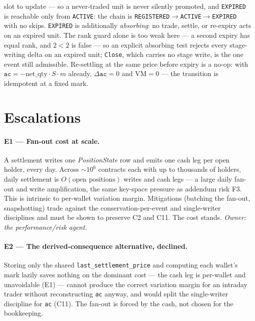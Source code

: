 \documentclass[11pt]{article}
\newcommand{\ac}{\texttt{ac}}
\newcommand{\netq}{\mathrm{net\_qty}}
\newcommand{\code}[1]{\texttt{#1}}
\newcommand{\mult}{m}
\begin{document}
\begin{itemize}
slot to update --- so a never-traded unit is never silently promoted, and \code{EXPIRED} is reachable
only from \code{ACTIVE}: the chain is \code{REGISTERED}$\to$\code{ACTIVE}$\to$\code{EXPIRED} with no
skips. \code{EXPIRED} is additionally \emph{absorbing}: no
trade, settle, or re-expiry acts on an expired unit. The rank guard alone is too weak here --- a
second expiry has equal rank, and $2<2$ is false --- so an explicit absorbing test rejects every
stage-writing delta on an expired unit; \code{Close}, which carries no stage write, is the one event
still admissible. Re-settling at the same price before expiry is a no-op: with
$\ac=-\netq\cdot S\cdot\mult$ already, $\Delta\ac=0$ and $\mathrm{VM}=0$ --- the transition is
idempotent at a fixed mark.
\end{itemize}

\section{Escalations}

\paragraph{E1 --- Fan-out cost at scale.} A settlement writes one \emph{PositionState} row and emits
one cash leg per open holder, every day. Across $\sim\!10^{6}$ contracts each with up to thousands of
holders, daily settlement is $O(\text{open positions})$ writes and cash legs --- a large daily
fan-out and write amplification, the same key-space pressure as addendum risk F3. This is intrinsic
to per-wallet variation margin. Mitigations (batching the fan-out, snapshotting) trade against the
conservation-per-event and single-writer disciplines and must be shown to preserve C2 and C11. The
cost stands. \emph{Owner: the performance/risk agent.}

\paragraph{E2 --- The derived-consequence alternative, declined.} Storing only the shared
\code{last\_settlement\_price} and computing each wallet's mark lazily saves nothing on the dominant
cost --- the cash leg is per-wallet and unavoidable (E1) --- cannot produce the correct variation
margin for an intraday trader without reconstructing \ac{} anyway, and would split the single-writer
discipline for \ac{} (C11). The fan-out is forced by the cash, not chosen for the bookkeeping.
\end{document}
